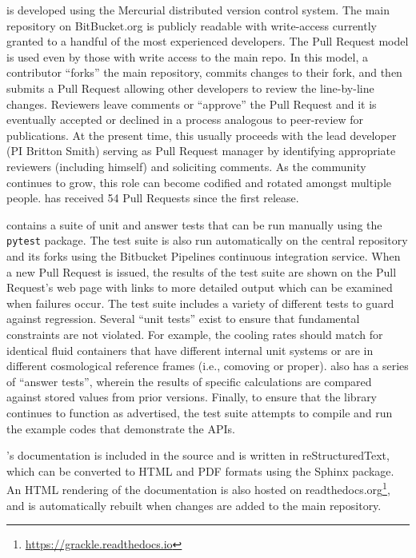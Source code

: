 \grackle{} is developed using the Mercurial distributed version
control system.  The main repository on BitBucket.org is publicly
readable with write-access currently granted to a handful of the most
experienced developers.  The Pull Request model is used even by those
with write access to the main repo.  In this model, a contributor
``forks'' the main repository, commits changes to their fork, and then
submits a Pull Request allowing other developers to review the
line-by-line changes.  Reviewers leave comments or ``approve'' the
Pull Request and it is eventually accepted or declined in a process
analogous to peer-review for publications.  At the present time, this
usually proceeds with the lead developer (PI Britton Smith) serving as
Pull Request manager by identifying appropriate reviewers (including
himself) and soliciting comments.  As the community continues to grow,
this role can become codified and rotated amongst multiple people.
\grackle{} has received 54 Pull Requests since the first release.

\grackle{} contains a suite of unit and answer
tests that can be run manually using the \texttt{pytest} package.  The
test suite is also run automatically on the central repository and its
forks using the Bitbucket Pipelines continuous integration service.
When a new Pull Request is issued, the results of the test suite are
shown on the Pull Request's web page with links to more detailed
output which can be examined when failures occur.  The test suite
includes a variety of different tests to guard against regression.
Several ``unit tests'' exist to ensure that fundamental
constraints are not violated.  For example, the cooling rates should
match for identical fluid containers that have different internal unit
systems or are in different cosmological reference frames (i.e.,
comoving or proper).  \grackle{} also has a series of ``answer
tests'', wherein the results of specific calculations are compared
against stored values from prior versions.  Finally, to ensure that
the library continues to function as advertised, the test suite
attempts to compile and run the example codes that demonstrate the
APIs.

\grackle{}'s documentation is included in the source and is written in
reStructuredText, which can be converted to HTML and PDF formats
using the Sphinx package.  An HTML rendering of the documentation is
also hosted on
readthedocs.org\footnote{\url{https://grackle.readthedocs.io}},
and is automatically rebuilt when changes are added to the main
repository.

